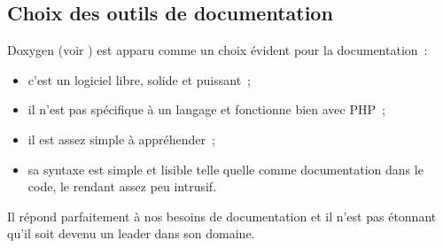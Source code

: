 \subsection{Choix des outils de documentation}

Doxygen (voir \cite{doxygen}) est apparu comme un choix évident pour la documentation~:
\begin{itemize}
    \item c'est un logiciel libre, solide et puissant~;
    \item il n'est pas spécifique à un langage et fonctionne bien avec PHP~;
    \item il est assez simple à appréhender~;
    \item sa syntaxe est simple et lisible telle quelle comme documentation dans le code, le rendant assez peu intrusif.
\end{itemize}
Il répond parfaitement à nos besoins de documentation et il n'est pas étonnant qu'il soit devenu un leader dans son domaine.
